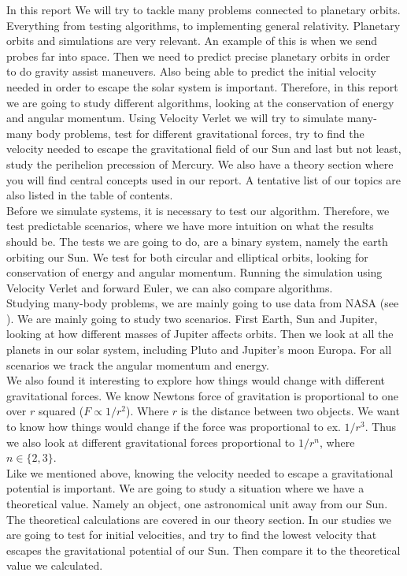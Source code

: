 \documentclass[reprint, english,notitlepage,nofootinbib]{revtex4-1}  %
\begin{document}
In this report We will try to tackle many problems connected to planetary orbits. Everything from testing algorithms, to implementing general relativity. Planetary orbits and simulations are very relevant. An example of this is when we send probes far into space. Then we need to predict precise planetary orbits in order to do gravity assist maneuvers. Also being able to predict the initial velocity needed in order to escape the solar system is important. Therefore, in this report we are going to study different algorithms, looking at the conservation of energy and angular momentum. Using Velocity Verlet we will try to simulate many-many body problems, test for different gravitational forces, try to find the velocity needed to escape the gravitational field of our Sun and last but not least, study the perihelion precession of Mercury. We also have a theory section where you will find central concepts used in our report. A tentative list of our topics are also listed in the table of contents.
\\
Before we simulate systems, it is necessary to test our algorithm. Therefore, we test predictable scenarios, where we have more intuition on what the results should be. The tests we are going to do, are a binary system, namely the earth orbiting our Sun. We test for both circular and elliptical orbits, looking for conservation of energy and angular momentum. Running the simulation using Velocity Verlet and forward Euler, we can also compare algorithms.
\\
Studying many-body problems, we are mainly going to use data from NASA (see \citep{NASA}). We are mainly going to study two scenarios. First Earth, Sun and Jupiter, looking  at how different masses of Jupiter affects orbits. Then we look at all the planets in our solar system, including Pluto and Jupiter's moon Europa. For all scenarios we track the angular momentum and energy.
\\
We also found it interesting to explore how things would change with different gravitational forces. We know Newtons force of gravitation is proportional to one over $r$ squared ($F\propto1/r^2$). Where $r$ is the distance between two objects. We want to know how things would change if the force was proportional to ex. $1/r^3$. Thus we also look at different gravitational forces proportional to $1/r^n$, where $n\in\{2,3\}$.
\\
Like we mentioned above, knowing the velocity needed to escape a gravitational potential is important. We are going to study a situation where we have a theoretical value. Namely an object, one astronomical unit away from our Sun. The theoretical calculations are covered in our theory section. In our studies we are going to test for initial velocities, and try to find the lowest velocity that escapes the gravitational potential of our Sun. Then compare it to the theoretical value we calculated.
\end{document}
